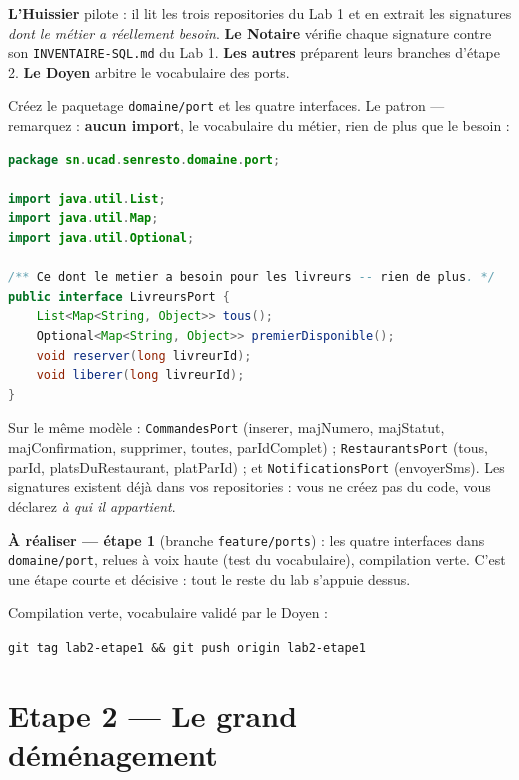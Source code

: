 \documentclass[a4paper,11pt]{article}
\begin{document}
\begin{collabox}
\textbf{L'Huissier} pilote : il lit les trois repositories du Lab 1 et en
extrait les signatures \emph{dont le métier a réellement besoin}.
\textbf{Le Notaire} vérifie chaque signature contre son
\texttt{INVENTAIRE-SQL.md} du Lab 1. \textbf{Les autres} préparent leurs
branches d'étape 2. \textbf{Le Doyen} arbitre le vocabulaire des ports.
\end{collabox}

Créez le paquetage \texttt{domaine/port} et les quatre interfaces. Le
patron --- remarquez : \textbf{aucun import}, le vocabulaire du métier,
rien de plus que le besoin :

\begin{lstlisting}[language=java]
package sn.ucad.senresto.domaine.port;

import java.util.List;
import java.util.Map;
import java.util.Optional;

/** Ce dont le metier a besoin pour les livreurs -- rien de plus. */
public interface LivreursPort {
    List<Map<String, Object>> tous();
    Optional<Map<String, Object>> premierDisponible();
    void reserver(long livreurId);
    void liberer(long livreurId);
}
\end{lstlisting}

Sur le même modèle : \texttt{CommandesPort} (inserer, majNumero,
majStatut, majConfirmation, supprimer, toutes, parIdComplet) ;
\texttt{RestaurantsPort} (tous, parId, platsDuRestaurant, platParId) ;
et \texttt{NotificationsPort} (envoyerSms). Les signatures existent déjà dans vos repositories : vous ne
créez pas du code, vous déclarez \emph{à qui il appartient}.

\begin{todobox}
\textbf{À réaliser --- étape 1} (branche \texttt{feature/ports}) :
les quatre interfaces dans \texttt{domaine/port}, relues à voix haute
(test du vocabulaire), compilation verte. C'est une étape courte et
décisive : tout le reste du lab s'appuie dessus.
\end{todobox}

\begin{tagbox}
Compilation verte, vocabulaire validé par le Doyen :
\begin{center}
\texttt{git tag lab2-etape1 \&\& git push origin lab2-etape1}
\end{center}
\end{tagbox}

\section{Etape 2 --- Le grand déménagement}
\end{document}
